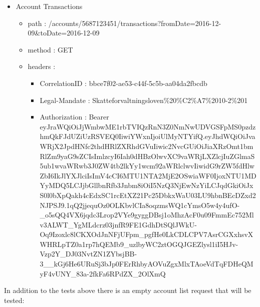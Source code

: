 \documentclass[12pt]{report}
\begin{document}
\begin{itemize}
  \item Account Transactions
  \begin{itemize}
    \item path : /accounts/5687123451/transactions?fromDate=2016-12-09&toDate=2016-12-09
    \item method : GET
    \item headers :
    \begin{itemize}
      \item CorrelationID : bbce7f02-ae53-c44f-5c5b-aa04da2fbcdb
      \item Legal-Mandate : Skatteforvaltningsloven\%20\%C2\%A7\%2010-2\%201
      \item Authorization : Bearer eyJraWQiOiJjWmbwME1rbTVIQzRnN3Z0NmNwUDVGSFpMS0pzdzhmQkFJdUZiUzRSVEQ0IiwiYWxnIjoiUlMyNTYifQ.eyJhdWQiOiJvaWRjX2JpdHNfc2thdHRlZXRhdGVuIiwic2NvcGUiOiJiaXRzOmt1bmRlZm9yaG9sZCIsImlzcyI6Iah0dHBzOlwvXC9vaWRjLXZlcjIuZGlmaS5ub1wvaWRwb3J0ZW4tb2lkYy1wcm92aWRlclwvIiwidG9rZW5fdHlwZbI6IkJlYXJlciIsImV4cCI6MTU1NTA2MjE2OSwiaWF0IjoxNTU1MDYyMDQ5LCJjbGllbnRfb3Jnbm8iOiI5NzQ3NjEwNzYiLCJqdGkiOiJxS0l0bXpQakh4cEdxSC1rcEtXZ21Pc25DbkxWaU03LU9hbnBEcDZxd2NJPSJ9.1qQ2jjequOz0OLKbvlCIa8oqzmsWQ1cYmsO5w4y4ufO-\_o5sQQ4VX6jqdc3Lrop2VYe9gyggDBsj1oMhzAcF0u09FmmEc752Mlv3ALWT\_YgMLdcrz03jnfR9FE1GdhDtSQlJWkU-Oq9Izoxlc8lCKXOdJnNFjUFpm\_pgfHe0LkCDLCPV7AsrCGXxhsvXWHRLpTZ0a1rp7hQEMb9\_uzlbyWC2ztOGQJGEZlysl1iI5HJv-Vzp2Y\_DJ03NvtZN1ZYbsjBB-3\_\_kGj6He6URuSj3bJp0FErRhbyAOVuZgxMlxTAoeVdTqFDHeQMyF4vUNY\_83a-2fkFa6RPdZX\_2OlXmQ
    \end{itemize}
  \end{itemize}
\end{itemize}

In addition to the tests above there is an empty account list request that will be tested:
\end{document}
